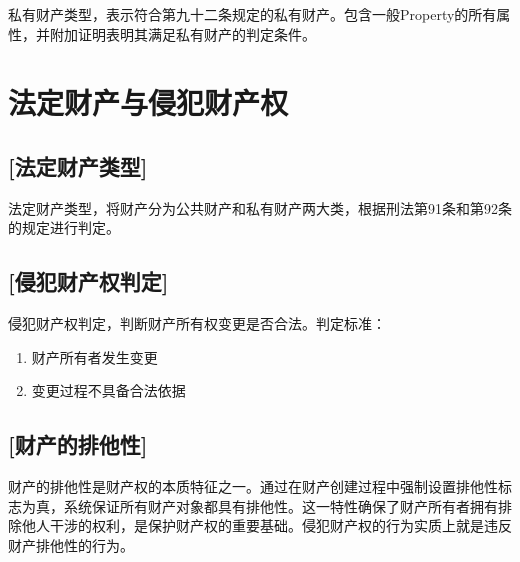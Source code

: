 \begin{definition}\label{PrivateProperty}
\leanok
{}
私有财产类型，表示符合第九十二条规定的私有财产。包含一般Property的所有属性，并附加证明表明其满足私有财产的判定条件。
\end{definition}

\section{法定财产与侵犯财产权}

\subsection{[法定财产类型]}

\begin{definition}\label{LegalProperty}
\leanok
{}
法定财产类型，将财产分为公共财产和私有财产两大类，根据刑法第91条和第92条的规定进行判定。
\end{definition}

\subsection{[侵犯财产权判定]}

\begin{definition}\label{isPropertyRightsViolation}
\leanok
{}
侵犯财产权判定，判断财产所有权变更是否合法。判定标准：
\begin{enumerate}
\item 财产所有者发生变更
\item 变更过程不具备合法依据
\end{enumerate}
\end{definition}

\subsection{[财产的排他性]}

\begin{definition}\label{propertyExclusivity}
\leanok
{}
财产的排他性是财产权的本质特征之一。通过在财产创建过程中强制设置排他性标志为真，系统保证所有财产对象都具有排他性。这一特性确保了财产所有者拥有排除他人干涉的权利，是保护财产权的重要基础。侵犯财产权的行为实质上就是违反财产排他性的行为。
\end{definition}
